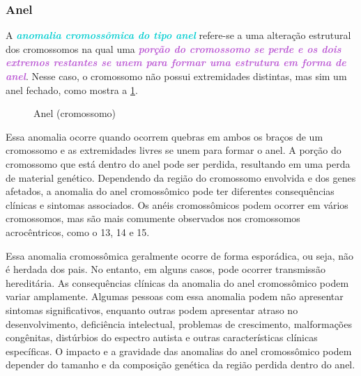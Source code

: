 \documentclass[11pt,a4paper]{article}
\begin{document}
\subsubsection*{Anel}

	A \textcolor{DarkTurquoise}{\textbf{\textit{anomalia cromossômica do tipo anel}}} refere-se a uma alteração estrutural dos cromossomos na qual uma\textcolor{MediumOrchid}{\textbf{\textit{ porção do cromossomo se perde e os dois extremos restantes se unem para formar uma estrutura em forma de anel}}}. Nesse caso, o cromossomo não possui extremidades distintas, mas sim um anel fechado, como mostra a \ref{fig:aberracaoAnel}.

	\begin{figure}
		\caption{Anel (cromossomo)}
		\label{fig:aberracaoAnel}
	\end{figure}	

	Essa anomalia ocorre quando ocorrem quebras em ambos os braços de um cromossomo e as extremidades livres se unem para formar o anel. A porção do cromossomo que está dentro do anel pode ser perdida, resultando em uma perda de material genético. Dependendo da região do cromossomo envolvida e dos genes afetados, a anomalia do anel cromossômico pode ter diferentes consequências clínicas e sintomas associados. Os anéis cromossômicos podem ocorrer em vários cromossomos, mas são mais comumente observados nos cromossomos acrocêntricos, como o 13, 14 e 15.
	
	Essa anomalia cromossômica geralmente ocorre de forma esporádica, ou seja, não é herdada dos pais. No entanto, em alguns casos, pode ocorrer transmissão hereditária. As consequências clínicas da anomalia do anel cromossômico podem variar amplamente. Algumas pessoas com essa anomalia podem não apresentar sintomas significativos, enquanto outras podem apresentar atraso no desenvolvimento, deficiência intelectual, problemas de crescimento, malformações congênitas, distúrbios do espectro autista e outras características clínicas específicas. O impacto e a gravidade das anomalias do anel cromossômico podem depender do tamanho e da composição genética da região perdida dentro do anel.
\end{document}
